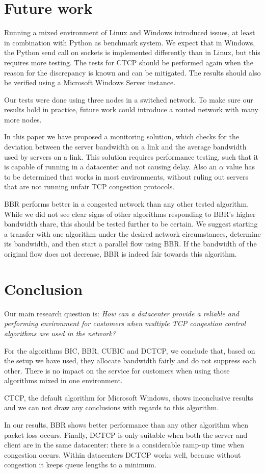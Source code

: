 \documentclass{article}
\begin{document}
\section{Future work}\label{sec:futurework}

Running a mixed environment of Linux and Windows introduced issues, at least in
combination with Python as benchmark system. We expect that in Windows, the
Python send call on sockets is implemented differently than in Linux, but this
requires more testing. The tests for CTCP should be performed again when the
reason for the discrepancy is known and can be mitigated. The results should
also be verified using a Microsoft Windows Server instance.

Our tests were done using three nodes in a switched network. To make sure our
results hold in practice, future work could introduce a routed network with
many more nodes.

In this paper we have proposed a monitoring solution, which checks for the deviation between the server bandwidth on a link and the average bandwidth used by servers on a link. This solution requires performance testing, such that it is capable of running in a datacenter and not causing delay. Also an $\alpha$ value has to be determined that works in most environments, without ruling out servers that are not running unfair TCP congestion protocols.

BBR performs better in a congested network than any other tested algorithm.
While we did not see clear signs of other algorithms responding to BBR's higher
bandwidth share, this should be tested further to be certain. We suggest
starting a transfer with one algorithm under the desired network circumstances,
determine its bandwidth, and then start a parallel flow using BBR. If the
bandwidth of the original flow does not decrease, BBR is indeed fair towards
this algorithm.


\section{Conclusion}\label{sec:conclusion}

Our main research question is: {\it How can a datacenter provide a reliable and performing environment for customers when multiple TCP congestion control algorithms are used in the network?} 

For the algorithms BIC, BBR, CUBIC and DCTCP, we conclude that, based on the setup we have used, they allocate
bandwidth fairly and do not suppress each other. There is no impact on the
service for customers when using those algorithms mixed in one environment.

CTCP, the default algorithm for Microsoft Windows, shows inconclusive results
and we can not draw any conclusions with regards to this algorithm.

In our results, BBR shows better performance than any other algorithm when
packet loss occurs. Finally, DCTCP is only suitable when both the server and
client are in the same datacenter: there is a considerable ramp-up time when
congestion occurs. Within datacenters DCTCP works well, because without
congestion it keeps queue lengths to a minimum.

\printbibliography
\end{document}
